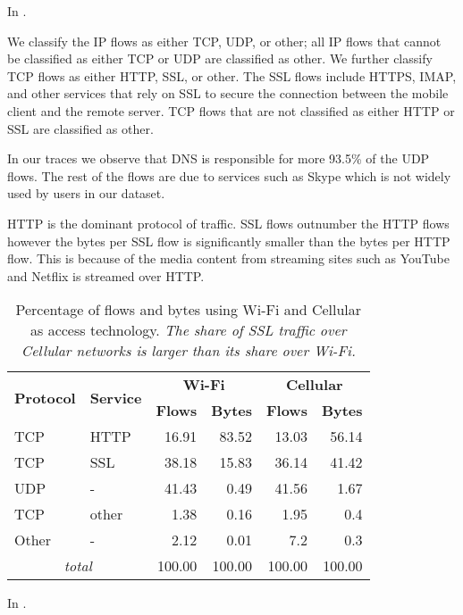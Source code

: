 In .

We classify the IP flows as either TCP, UDP, or other; all IP flows
that cannot be classified as either TCP or UDP are classified as
other. We further classify TCP flows as either HTTP, SSL, or
other. The SSL flows include HTTPS, IMAP, and other services that rely
on SSL to secure the connection between the mobile client and the
remote server. TCP flows that are not classified
as either HTTP or SSL are classified as other.  

In our traces we observe that DNS is responsible for more 93.5\% of
the UDP flows. The rest of the flows are due to services such as
Skype which is not widely used by users in our dataset. 

HTTP is the dominant protocol of traffic. SSL flows outnumber the HTTP
flows however the bytes per SSL flow is significantly smaller than the
bytes per HTTP flow. This is because of the media content from
streaming sites such as YouTube and Netflix is streamed over HTTP. 

\begin{table}
\begin{center}
\begin{tabular}{|l|l|r|r|r|r|}
\hline
\multirow{2}{*}{\bf Protocol} & \multirow{2}{*}{\bf Service} & \multicolumn{2}{|c|}{\bf Wi-Fi} & \multicolumn{2}{|c|}{\bf Cellular} \tabularnewline
\cline{3-6}
           &           &  \textbf{Flows}  &  \textbf{Bytes}  &  \textbf{Flows}  &  \textbf{Bytes}  \tabularnewline
\hline
 TCP       &  HTTP     &  16.91  &  83.52  &  13.03  &  56.14  \tabularnewline
\hline
 TCP       &  SSL      &  38.18  &  15.83  &  36.14  &  41.42  \tabularnewline
\hline
UDP       &  -        &  41.43  &   0.49  &  41.56  &   1.67  \tabularnewline
\hline
TCP       &  other    &   1.38 &   0.16  &   1.95  &   0.4  \tabularnewline
\hline
Other     &  -        &   2.12  &  0.01  &   7.2  &   0.3  \tabularnewline
\hline
\multicolumn{2}{|c|}{\emph{total}} & 100.00 & 100.00 & 100.00 & 100.00 \tabularnewline
\hline
\end{tabular}
\end{center}
\caption{Percentage of flows and bytes using Wi-Fi and Cellular as access technology.  \emph{The share of SSL traffic over Cellular
    networks is larger than its share over Wi-Fi.}}  
\label{tab:summaryWifiCellularTraffic}
\end{table}


In .

